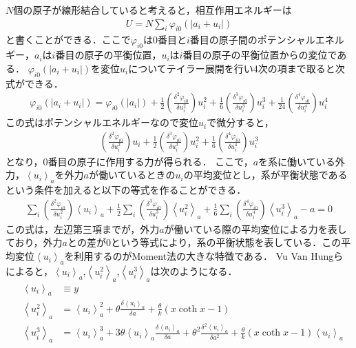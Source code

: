 $N$個の原子が線形結合していると考えると，相互作用エネルギーは
\begin{eqnarray}
\label{eq:moment1}
U=N\sum_{i}\varphi_{i0}(|a_i+u_i|)
\end{eqnarray}
と書くことができる．ここで$\varphi_{i0}$は0番目と$i$番目の原子間のポテンシャルエネルギー，$a_i$は$i$番目の原子の平衡位置，$u_i$は$i$番目の原子の平衡位置からの変位である．
$\varphi_{i0}(|a_i+u_i|)$を変位$u_i$についてテイラー展開を行い4次の項まで取ると次式ができる．
\begin{eqnarray}
\label{eq:moment2}
\varphi_{i0}(|a_i+u_i|)=\varphi_{i0}(|a_i|)+
\frac{1}{2}\left( \frac{\delta^2\varphi_{i0}}{\delta u_i^2} \right) u_i^2+
\frac{1}{6}\left( \frac{\delta^3\varphi_{i0}}{\delta u_i^3} \right) u_i^3+
\frac{1}{24}\left( \frac{\delta^4\varphi_{i0}}{\delta u_i^4} \right) u_i^4
\end{eqnarray}
この式はポテンシャルエネルギーなので変位$u_i$で微分すると，
\begin{eqnarray}
\label{eq:moment3}
\left( \frac{\delta^2\varphi_{i0}}{\delta u_i^2} \right) u_i+
\frac{1}{2}\left( \frac{\delta^3\varphi_{i0}}{\delta u_i^3} \right) u_i^2+
\frac{1}{6}\left( \frac{\delta^4\varphi_{i0}}{\delta u_i^4} \right) u_i^3
\end{eqnarray}
となり，0番目の原子に作用する力が得られる．
ここで，$a$を系に働いている外力，$\left<u_i\right>_a$を外力$a$が働いているときの$u_i$の平均変位とし，系が平衡状態であるという条件を加えると以下の等式を作ることができる．
\begin{eqnarray}
\label{eq:moment4}
\sum_i\left( \frac{\delta^2\varphi_{i0}}{\delta u_i^2} \right) \left<u_i\right>_a+
\frac{1}{2}\sum_i\left( \frac{\delta^3\varphi_{i0}}{\delta u_i^3} \right) \left<u_i^2\right>_a+
\frac{1}{6}\sum_i\left( \frac{\delta^4\varphi_{i0}}{\delta u_i^4} \right) \left<u_i^3\right>_a- a =0
\end{eqnarray}
この式は，左辺第三項までが，外力$a$が働いている際の平均変位による力を表しており，外力$a$との差が0という等式により，系の平衡状態を表している．この平均変位$\left<u_i\right>_a$を利用するのがMoment法の大きな特徴である．
Vu Van Hungらによると，$\left<u_i\right>_a$,$\left<u_i^2\right>_a$,$\left<u_i^3\right>_a$は次のようになる\cite[p.514]{jindo2}．
\begin{eqnarray}
\label{eq:moment5}
&\left<u_i\right>_a& \equiv y\\
\label{eq:moment6}
&\left<u_i^2\right>_a& = \left<u_i\right>_a^2 + \theta \frac{\delta\left<u_i\right>_a}{\delta a} + \frac{\theta}{k}(x \coth x-1)\\
\label{eq:moment7}
&\left<u_i^3\right>_a& = \left<u_i\right>_a^3 + 3 \theta \left<u_i\right>_a \frac{\delta\left<u_i\right>_a}{\delta a} 
+\theta^2 \frac{\delta^2\left<u_i\right>_a}{\delta a^2} 
+ \frac{\theta}{k}(x \coth x-1) \left<u_i\right>_a
\end{eqnarray}
